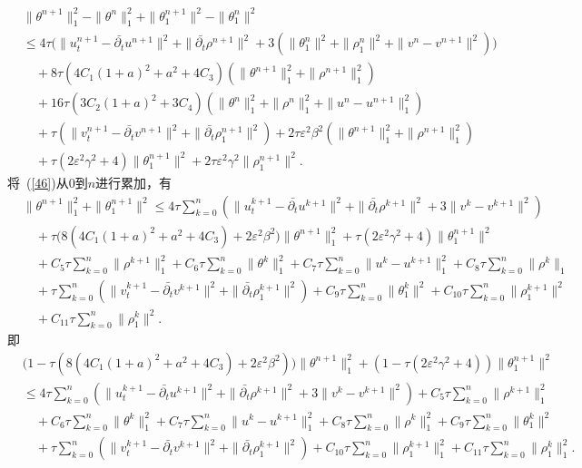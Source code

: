 \documentclass[twoside,UTF8]{nputhesis}
\begin{document}
\begin{equation}
\begin{split}
&\|\theta^{n+1}\|^2_1-\| \theta^n\|^2_1+\| \theta^{n+1}_1\|^2-\| \theta^n_1\|^2 \\
&\leq 4\tau\big(\| u^{n+1}_t-\bar{\partial_t}u^{n+1}\|^2+\| \bar{\partial_t}\rho^{n+1}\|^2+3(\|\theta_1^n\|^2+\|\rho_1^n\|^2+\|v^n-v^{n+1}\|^2)\big)\\
&\quad +8\tau(4C_1(1+a)^2+a^2+4C_3)(\| \theta^{n+1}\|^2_1+\| \rho^{n+1}\|^2_1)\\
&\quad +16\tau(3C_2(1+a)^2+3C_4)(\| \theta^n\|^2_1\!+\|\rho^n\|_1^2+\|u^n-u^{n+1}\|_1^2)\\
&\quad +\tau(\| v_t^{n+1}-\bar{\partial_t}v^{n+1}\|^2+\| \bar{\partial_t}\rho^{n+1}_1\|^2)+2\tau\varepsilon^2\beta^2(\| \theta^{n+1}\|^2_1+\| \rho^{n+1}\|^2_1)\\
&\quad+\tau(2\varepsilon^2\gamma^2+4)\| \theta^{n+1}_1\|^2+2\tau\varepsilon^2\gamma^2\| \rho^{n+1}_1\|^2.
\label{46}
\end{split}
\end{equation}
将~(\ref{46})从0到$n$进行累加，有
\begin{equation*}
\begin{split}
&\|\theta^{n+1}\|^2_1+\|\theta^{n+1}_1\|^2\leq 4\tau\sum_{k=0}^{n}(\| u^{k+1}_t-\bar{\partial_t}u^{k+1}\|^2+\| \bar{\partial_t}\rho^{k+1}\|^2+3\|v^k-v^{k+1}\|^2)\\
&\quad +\tau\Big(8(4C_1(1+a)^2+a^2+4C_3)+2\varepsilon^2\beta^2\Big)\| \theta^{n+1}\|^2_1+\tau(2\varepsilon^2\gamma^2+4)\| \theta^{n+1}_1\|^2\\
&\quad +C_5\tau\sum_{k=0}^{n}\|\rho^{k+1}\|_1^2+C_6\tau\sum_{k=0}^{n}\| \theta^{k}\|^2_1+C_7\tau\sum_{k=0}^{n}\|u^k-u^{k+1}\|_1^2+C_{8}\tau\sum^n_{k=0}\|\rho^k\|_1\\
&\quad +\tau\sum_{k=0}^{n}(\| v_t^{k+1}-\bar{\partial_t}v^{k+1}\|^2+\| \bar{\partial_t}\rho^{k+1}_1\|^2)+C_9\tau\sum_{k=0}^{n}\|\theta^{k}_1\|^2+C_{10}\tau\sum_{k=0}^{n}\| \rho^{k+1}_1\|^2\\
&\quad+C_{11}\tau\sum_{k=0}^n\|\rho^k_1\|^2.
\end{split}
\end{equation*}
即
\begin{equation*}
\begin{split}
&\Big(1-\tau(8(4C_1(1+a)^2+a^2+4C_3)+2\varepsilon^2\beta^2)\Big)\| \theta^{n+1}\|^2_1+(1-\tau(2\varepsilon^2\gamma^2+4))\| \theta^{n+1}_1\|^2\\
&\leq 4\tau\sum_{k=0}^{n}(\| u^{k+1}_t-\bar{\partial_t}u^{k+1}\|^2+\| \bar{\partial_t}\rho^{k+1}\|^2+3\|v^k-v^{k+1}\|^2)+C_5\tau\sum_{k=0}^{n}\|\rho^{k+1}\|_1^2\\
&\quad +C_6\tau\sum_{k=0}^{n}\| \theta^{k}\|^2_1+C_7\tau\sum_{k=0}^{n}\|u^k-u^{k+1}\|_1^2+C_{8}\tau\sum^n_{k=0}\| \rho^k\|^2_1+C_9\tau\sum_{k=0}^n\| \theta^k_1\|^2\\
&\quad +\tau\sum_{k=0}^{n}(\| v_t^{k+1}-\bar{\partial_t}v^{k+1}\|^2+\| \bar{\partial_t}\rho^{k+1}_1\|^2)+C_{10}\tau\sum_{k=0}^{n}\| \rho^{k+1}_1\|^2_1+C_{11}\tau\sum^{n}_{k=0}\|\rho^k_1\|^2_1.
\label{47}
\end{split}
\end{equation*}
\end{document}
